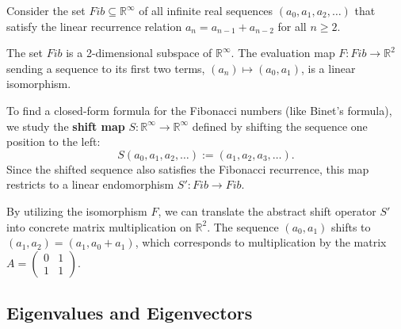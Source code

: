 Consider the set $Fib \subseteq \mathbb{R}^\infty$ of all infinite real sequences $(a_0, a_1, a_2, \dots)$ that satisfy the linear recurrence relation $a_n = a_{n-1} + a_{n-2}$ for all $n \ge 2$.

\begin{proposition}
  The set $Fib$ is a 2-dimensional subspace of $\mathbb{R}^\infty$. The evaluation map $F \colon Fib \to \mathbb{R}^2$ sending a sequence to its first two terms, $(a_n) \mapsto (a_0, a_1)$, is a linear isomorphism.
\end{proposition}

To find a closed-form formula for the Fibonacci numbers (like Binet's formula), we study the \textbf{shift map} $S \colon \mathbb{R}^\infty \to \mathbb{R}^\infty$ defined by shifting the sequence one position to the left:
\[ S(a_0, a_1, a_2, \dots) := (a_1, a_2, a_3, \dots). \]
Since the shifted sequence also satisfies the Fibonacci recurrence, this map restricts to a linear endomorphism $S' \colon Fib \to Fib$.

By utilizing the isomorphism $F$, we can translate the abstract shift operator $S'$ into concrete matrix multiplication on $\mathbb{R}^2$. The sequence $(a_0, a_1)$ shifts to $(a_1, a_2) = (a_1, a_0 + a_1)$, which corresponds to multiplication by the matrix $A = \left(\begin{smallmatrix} 0 & 1 \\ 1 & 1 \end{smallmatrix}\right)$.

\begin{center}
\end{center}

\subsection{Eigenvalues and Eigenvectors}

